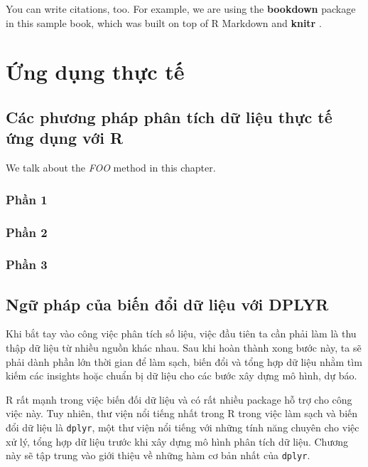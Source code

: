 \documentclass[]{krantz}
\theoremstyle{definition}
\theoremstyle{definition}
\theoremstyle{definition}
\theoremstyle{remark}
\begin{document}
You can write citations, too. For example, we are using the
\textbf{bookdown} package \citep{R-bookdown} in this sample book, which
was built on top of R Markdown and \textbf{knitr} \citep{xie2015}.

\mainmatter

\hypertarget{part-ng-dung-thc-t}{%
\part{Ứng dụng thực tế}\label{part-ng-dung-thc-t}}

\hypertarget{cac-phuong-phap-phan-tich-d-liu-thc-t-ng-dung-vi-r}{%
\chapter{Các phương pháp phân tích dữ liệu thực tế ứng dụng với
R}\label{cac-phuong-phap-phan-tich-d-liu-thc-t-ng-dung-vi-r}}

We talk about the \emph{FOO} method in this chapter.

\hypertarget{phn-1}{%
\section{Phần 1}\label{phn-1}}

\hypertarget{phn-2}{%
\section{Phần 2}\label{phn-2}}

\hypertarget{phn-3}{%
\section{Phần 3}\label{phn-3}}

\hypertarget{ng-phap-cua-bin-i-d-liu-vi-dplyr}{%
\chapter{Ngữ pháp của biến đổi dữ liệu với
DPLYR}\label{ng-phap-cua-bin-i-d-liu-vi-dplyr}}

Khi bắt tay vào công việc phân tích số liệu, việc đầu tiên ta cần phải
làm là thu thập dữ liệu từ nhiều nguồn khác nhau. Sau khi hoàn thành
xong bước này, ta sẽ phải dành phần lớn thời gian để làm sạch, biến đổi
và tổng hợp dữ liệu nhằm tìm kiếm các insights hoặc chuẩn bị dữ liệu cho
các bước xây dựng mô hình, dự báo.

R rất mạnh trong việc biến đối dữ liệu và có rất nhiều package hỗ trợ
cho công việc này. Tuy nhiên, thư viện nổi tiếng nhất trong R trong việc
làm sạch và biến đổi dữ liệu là \texttt{dplyr}, một thư viện nổi tiếng
với những tính năng chuyên cho việc xử lý, tổng hợp dữ liệu trước khi
xây dựng mô hình phân tích dữ liệu. Chương này sẽ tập trung vào giới
thiệu về những hàm cơ bản nhất của \texttt{dplyr}.
\end{document}
